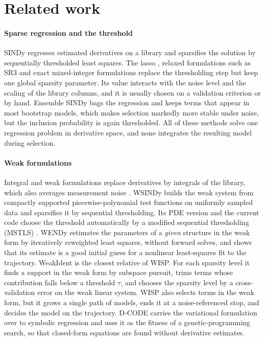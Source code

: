 \documentclass[10pt]{article}
\begin{document}
\section{Related work}\label{sec:related}

\paragraph{Sparse regression and the threshold} SINDy \cite{brunton2016} regresses estimated derivatives on a library and
sparsifies the solution by sequentially thresholded least squares. The lasso \cite{tibshirani1996}, relaxed
formulations such as SR3 \cite{champion2020sr3} and exact mixed-integer formulations \cite{bertsimas2023} replace the
thresholding step but keep one global sparsity parameter. Its value interacts with the noise level and the scaling of
the library columns, and it is usually chosen on a validation criterion or by hand. Ensemble SINDy \cite{fasel2022}
bags the regression and keeps terms that appear in most bootstrap models, which makes selection markedly more stable
under noise, but the inclusion probability is again thresholded. All of these methods solve one regression problem in
derivative space, and none integrates the resulting model during selection.

\paragraph{Weak formulations} Integral and weak formulations replace derivatives by integrals of the library, which
also averages measurement noise \cite{schaeffer2017,reinbold2020}. WSINDy \cite{messenger2021mms} builds the weak system
from compactly supported piecewise-polynomial test functions on uniformly sampled data and sparsifies it by sequential
thresholding. Its PDE version and the current code choose the threshold automatically by a modified sequential
thresholding (MSTLS) \cite{messenger2021jcp}. WENDy \cite{bortz2023} estimates the parameters of a \emph{given}
structure in the weak form by iteratively reweighted least squares, without forward solves, and shows that its estimate
is a good initial guess for a nonlinear least-squares fit to the trajectory. WeakIdent \cite{tang2023} is the closest
relative of WISP. For each sparsity level it finds a support in the weak form by subspace pursuit, trims terms whose
contribution falls below a threshold $\tau$, and chooses the sparsity level by a cross-validation error on the weak
linear system. WISP also selects terms in the weak form, but it grows a single path of models, ends it at a
noise-referenced stop, and decides the model on the trajectory. D-CODE \cite{qian2022} carries the variational
formulation over to symbolic regression and uses it as the fitness of a genetic-programming search, so that
closed-form equations are found without derivative estimates.
\end{document}
